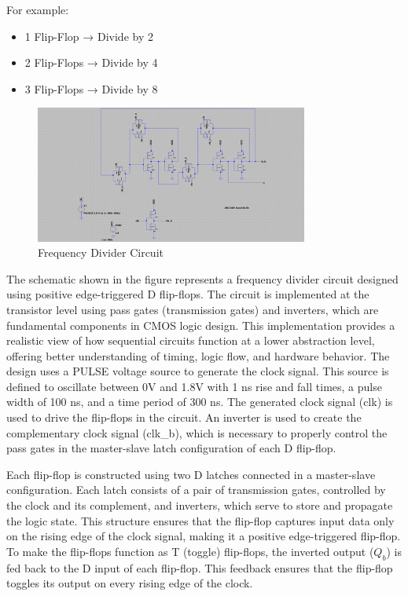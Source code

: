 For example:
\begin{itemize}
    \item 1 Flip-Flop → Divide by 2
    \item 2 Flip-Flops → Divide by 4
    \item 3 Flip-Flops → Divide by 8
\end{itemize}
\begin{figure}[H] %
    \centering
    \includegraphics[width=0.8\textwidth]{figs/circuit.png}
    \caption{Frequency Divider Circuit}
    \label{fig:LT Spice Circuit}
\end{figure}
The schematic shown in the figure represents a frequency divider circuit designed using positive edge-triggered D flip-flops. The circuit is implemented at the transistor level using pass gates (transmission gates) and inverters, which are fundamental components in CMOS logic design. This implementation provides a realistic view of how sequential circuits function at a lower abstraction level, offering better understanding of timing, logic flow, and hardware behavior.
The design uses a PULSE voltage source to generate the clock signal. This source is defined to oscillate between 0V and 1.8V with 1 ns rise and fall times, a pulse width of 100 ns, and a time period of 300 ns. The generated clock signal (clk) is used to drive the flip-flops in the circuit. An inverter is used to create the complementary clock signal (clk\_b), which is necessary to properly control the pass gates in the master-slave latch configuration of each D flip-flop.

Each flip-flop is constructed using two D latches connected in a master-slave configuration. Each latch consists of a pair of transmission gates, controlled by the clock and its complement, and inverters, which serve to store and propagate the logic state. This structure ensures that the flip-flop captures input data only on the rising edge of the clock signal, making it a positive edge-triggered flip-flop. To make the flip-flops function as T (toggle) flip-flops, the inverted output (\(Q_b\)) is fed back to the D input of each flip-flop. This feedback ensures that the flip-flop toggles its output on every rising edge of the clock.

